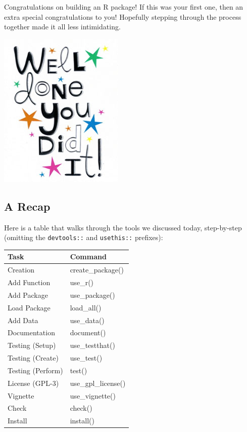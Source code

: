 \documentclass[
]{book}
\begin{document}
Congratulations on building an R package! If this was your first one, then an extra special congratulations to you! Hopefully stepping through the process together made it all less intimidating.

\begin{center}\includegraphics[width=0.5\linewidth]{images/well_done} \end{center}

\hypertarget{a-recap}{%
\subsection{A Recap}\label{a-recap}}

Here is a table that walks through the tools we discussed today, step-by-step (omitting the \texttt{devtools::} and \texttt{usethis::} prefixes):

\begin{tabular}{l|l}
\hline
Task & Command\\
\hline
Creation & create\_package()\\
\hline
Add Function & use\_r()\\
\hline
Add Package & use\_package()\\
\hline
Load Package & load\_all()\\
\hline
Add Data & use\_data()\\
\hline
Documentation & document()\\
\hline
Testing (Setup) & use\_testthat()\\
\hline
Testing (Create) & use\_test()\\
\hline
Testing (Perform) & test()\\
\hline
License (GPL-3) & use\_gpl\_license()\\
\hline
Vignette & use\_vignette()\\
\hline
Check & check()\\
\hline
Install & install()\\
\hline
\end{tabular}
\end{document}

